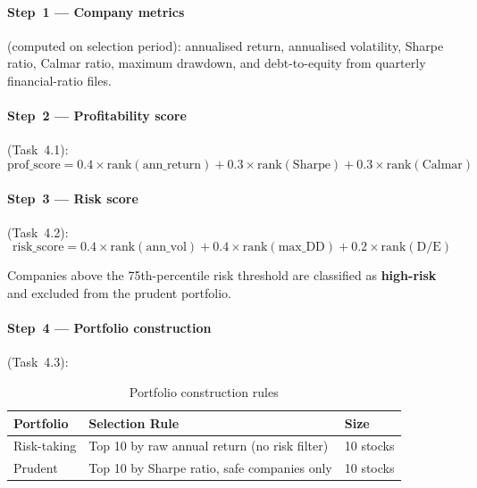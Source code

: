 \documentclass[12pt,a4paper]{article}
\begin{document}
\paragraph{Step~1 --- Company metrics} (computed on selection period):
annualised return, annualised volatility, Sharpe ratio, Calmar ratio, maximum
drawdown, and debt-to-equity from quarterly financial-ratio files.

\paragraph{Step~2 --- Profitability score} (Task~4.1):
\begin{equation}
  \text{prof\_score} = 0.4\times\text{rank}(\text{ann\_return})
                     + 0.3\times\text{rank}(\text{Sharpe})
                     + 0.3\times\text{rank}(\text{Calmar})
\end{equation}

\paragraph{Step~3 --- Risk score} (Task~4.2):
\begin{equation}
  \text{risk\_score} = 0.4\times\text{rank}(\text{ann\_vol})
                     + 0.4\times\text{rank}(\text{max\_DD})
                     + 0.2\times\text{rank}(\text{D/E})
\end{equation}

Companies above the 75th-percentile risk threshold are classified as
\textbf{high-risk} and excluded from the prudent portfolio.

\paragraph{Step~4 --- Portfolio construction} (Task~4.3):

\begin{table}[H]
\centering
\caption{Portfolio construction rules}
\begin{tabular}{lll}
\toprule
\textbf{Portfolio} & \textbf{Selection Rule} & \textbf{Size} \\
\midrule
Risk-taking & Top 10 by raw annual return (no risk filter) & 10 stocks \\
Prudent     & Top 10 by Sharpe ratio, safe companies only  & 10 stocks \\
\bottomrule
\end{tabular}
\end{table}
\end{document}
